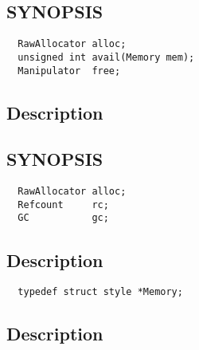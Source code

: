 \documentclass{article}
\begin{document}
\subsection{SYNOPSIS}
\begin{verbatim}
  RawAllocator alloc;
  unsigned int avail(Memory mem);
  Manipulator  free;
\end{verbatim}
\subsection*{Description}



\subsection{SYNOPSIS}
\begin{verbatim}
  RawAllocator alloc;
  Refcount     rc;
  GC           gc;
\end{verbatim}
\subsection*{Description}





\begin{verbatim}
  typedef struct style *Memory;
\end{verbatim}
\subsection*{Description} 
\end{document}

